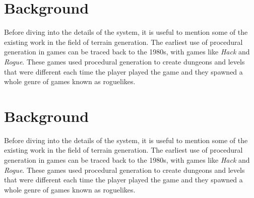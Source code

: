 \documentclass{article}
\begin{document}
\section{Background}
Before diving into the details of the system, it is useful to mention some of the existing work in
the field of terrain generation. The earliest use of procedural generation in games can be traced
back to the 1980s, with games like \textit{Hack} and \textit{Rogue}. These games used procedural
generation to create dungeons and levels that were different each time the player played the game
and they spawned a whole genre of games known as roguelikes.
\section{Background}
Before diving into the details of the system, it is useful to mention some of the existing work in
the field of terrain generation. The earliest use of procedural generation in games can be traced
back to the 1980s, with games like \textit{Hack} and \textit{Rogue}. These games used procedural
generation to create dungeons and levels that were different each time the player played the game
and they spawned a whole genre of games known as roguelikes.
\end{document}

